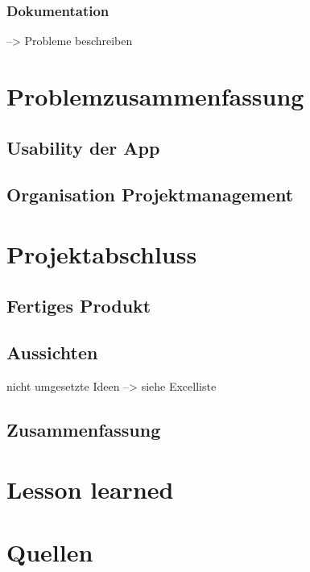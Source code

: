 \documentclass[12pt,a4paper]{article}
\begin{document}
\subsubsection*{Dokumentation} --> Probleme beschreiben
\newpage

\section{Problemzusammenfassung}
\subsection{Usability der App}
\newpage
\subsection{Organisation Projektmanagement}
\newpage
\section{Projektabschluss}
\subsection{Fertiges Produkt}
\subsection{Aussichten}
nicht umgesetzte Ideen --> siehe Excelliste
\newpage
\subsection{Zusammenfassung}
\newpage
\section{Lesson learned}
\newpage
\section*{Quellen}
\end{document}
